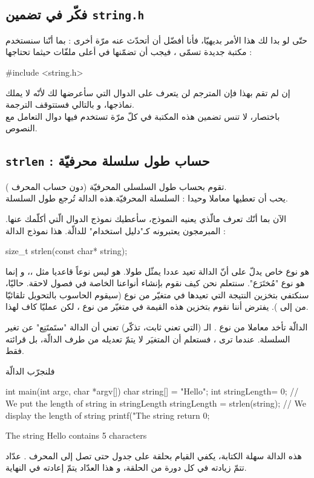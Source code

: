 \subsection{فكّر في تضمين \texttt{string.h}}
حتّى لو بدا لك هذا الأمر بديهيّا، فأنا أفضّل أن أتحدّث عنه مرّة أخرى : بما أنّنا سنستخدم مكتبة جديدة تسمّى
،
فيجب أن تضمّنها في أعلى ملفّات
حيثما تحتاجها :
\begin{Csource}
#include <string.h>
\end{Csource}
إن لم تقم بهذا فإن المترجم لن يتعرف على الدوال التي سأعرضها لك لأنّه لا يملك نماذجها، و بالتالي فستتوقف الترجمة.\\
باختصار، لا تنس تضمين هذه المكتبة في كلّ مرّة تستخدم فيها دوال التعامل مع النصوص.

\subsection{\texttt{strlen} : حساب طول سلسلة محرفيّة}
تقوم بحساب طول السلسلى المحرفيّة (دون حساب المحرف
).\\
يحب أن تعطيها معاملا وحيدا : السلسلة المحرفيّة.هذه الدالة تُرجع طول السلسلة.

الآن بما أنّك تعرف مالّذي يعنيه النموذج، سأعطيك نموذج الدوال الّتي أكلّمك عنها. المبرمجون يعتبرونه كـ"دليل استخدام" للدالّة.
هذا نموذج الدالة :
\begin{Csource}
size_t strlen(const char* string);
\end{Csource}
\begin{information}
هو نوع خاص يدلّ على أنّ الدالة تعيد عددا يمثّل طولا. هو ليس نوعاً قاعديا مثل
،،
و إنما هو نوع  "مُختَرَع". سنتعلم نحن كيف نقوم بإنشاء أنواعنا الخاصة في فصول لاحقة. حاليّا، سنكتفي بتخزين النتيجة التي تعيدها
في متغيّر من نوع
(سيقوم الحاسوب بالتحويل تلقائيّا من
إلى
).
يفترض أننا نقوم بتخزين هذه القيمة في متغيّر من نوع
،
لكن عمليّا
كاف لهذا.
\end{information}
الدالّة تأخد معاملا من نوع
.
الـ (التي تعني ثابت، تذكّر) تعني أن الدالة "ستَمتَنِع" عن تغير السلسلة. عندما ترى
،
فستعلم أن المتغيَر لا يتمّ تعديله من طرف الدالّة، بل قرائته فقط.

فلنجرّب الدالّة 
\begin{Csource}
int main(int argc, char *argv[])
{
	char string[] = "Hello";
	int stringLength= 0;
	// We put the length of string in stringLength
	 stringLength = strlen(string);
	// We display the length of string
	printf("The string %
	return 0;
}
\end{Csource}
\begin{Console}
The string Hello contains 5 characters
\end{Console}
هذه الدالة سهلة الكتابة، يكفي القيام بحلقة على جدول
حتى تصل إلى المحرف
.
عدّاد تتمّ زيادته في كل دورة من الحلقة، و هذا العدّاد يتمّ إعادته في النهاية.

